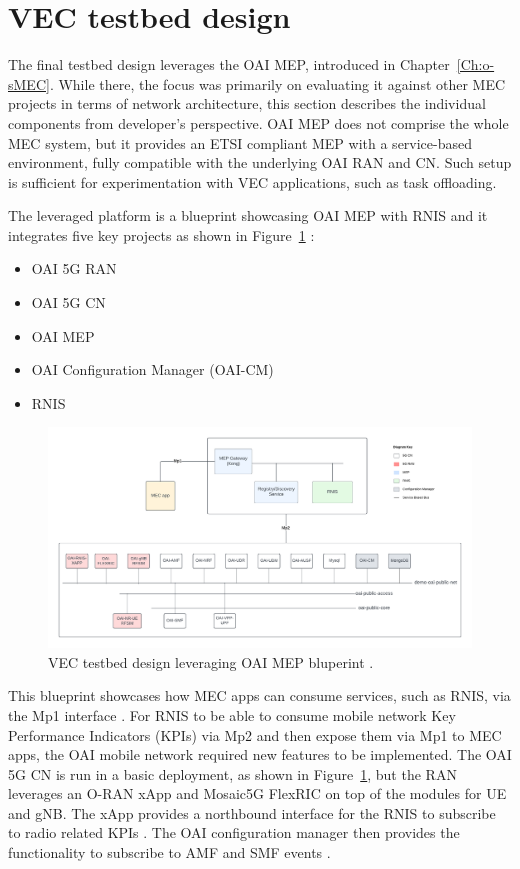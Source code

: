 \documentclass[12pt,a4paper,twoside]{report}
\begin{document}
\section{VEC testbed design}
The final testbed design leverages the OAI MEP, introduced in Chapter~\ref{Ch:o-sMEC}. While there, the focus was primarily on evaluating it against other MEC projects in terms of network architecture, this section describes the individual components from developer’s perspective. OAI MEP does not comprise the whole MEC system, but it provides an ETSI compliant MEP with a service-based environment, fully compatible with the underlying OAI RAN and CN. Such setup is sufficient for experimentation with VEC applications, such as task offloading.

The leveraged platform is a blueprint showcasing OAI MEP with RNIS and it integrates five key projects as shown in Figure~\ref{F:VEC-tstbed-arch} \cite{oai-blueprint-git}:
%
\begin{itemize}[itemsep=2pt]
	\item OAI 5G RAN
	\item OAI 5G CN
	\item OAI MEP
	\item OAI Configuration Manager (OAI-CM)
	\item RNIS
\end{itemize}
%
\begin{figure}[ht]
	\centering
	\begin{sideways}
		\includegraphics[width=20cm]{./images/OAI-MEP-parts.pdf} 	
	\end{sideways}
	\caption{VEC testbed design leveraging OAI MEP bluperint \cite{oai-blueprint-git}.}
	\label{F:VEC-tstbed-arch}
\end{figure}
%
\FloatBarrier
This blueprint showcases how MEC apps can consume services, such as RNIS, via the Mp1 interface \cite{oai-blueprint-git}. For RNIS to be able to consume mobile network Key Performance Indicators (KPIs) via Mp2 and then expose them via Mp1 to MEC apps, the OAI mobile network required new features to be implemented. The OAI 5G CN is run in a basic deployment, as shown in Figure~\ref{F:VEC-tstbed-arch}, but the RAN leverages an O-RAN xApp and Mosaic5G FlexRIC on top of the modules for UE and gNB. The xApp provides a northbound interface for the RNIS to subscribe to radio related KPIs \cite{oai-rnis-git}. The OAI configuration manager then provides the functionality to subscribe to AMF and SMF events \cite{oai-cm-git}.
\end{document}
